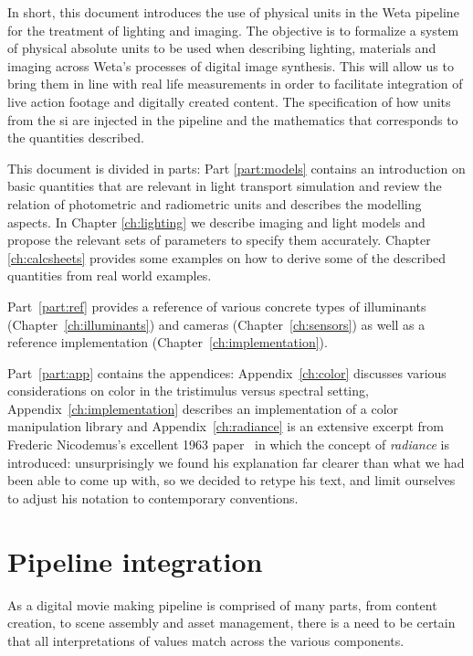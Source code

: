 In short, this document introduces the use of physical units in the
Weta pipeline for the treatment of lighting and imaging.  The
objective is to formalize a system of physical absolute units to be used
when describing lighting, materials and imaging across Weta's
processes of digital image synthesis. This will allow us to bring them in line
with real life measurements in order to facilitate integration of
live action footage and digitally created content. The specification of
how units from the \gls{si} are injected in the pipeline and the
mathematics that corresponds to the quantities described.


This document is divided in parts: Part \ref{part:models}
contains an introduction on basic quantities that are relevant in
light transport simulation and review the relation of photometric and
radiometric units and describes the modelling aspects. In Chapter
\ref{ch:lighting} we describe imaging and light models and propose the
relevant sets of parameters to specify them accurately.  Chapter
\ref{ch:calcsheets} provides some examples on how to derive some of
the described quantities from real world examples.

Part~\ref{part:ref} provides a reference of various concrete types of
illuminants (Chapter~\ref{ch:illuminants}) and cameras (Chapter~\ref{ch:sensors})
as well as a reference implementation (Chapter~\ref{ch:implementation}).

Part~\ref{part:app} contains the appendices: Appendix~\ref{ch:color} discusses
various considerations on color in the tristimulus versus spectral setting,
Appendix~\ref{ch:implementation} describes an implementation of a color manipulation library
and Appendix~\ref{ch:radiance} is an extensive excerpt from Frederic Nicodemus's 
excellent 1963 paper~\cite{nicodemus63} in which the concept of \textsl{radiance}
is introduced: unsurprisingly we found his explanation far clearer than what we 
had been able to come up with, so we decided to retype his text, and limit ourselves
to adjust his notation to contemporary conventions.

\section{Pipeline integration}

As a digital movie making pipeline is comprised of many parts, from content creation, to
scene assembly and asset management, there is a need to
be certain that all interpretations of values match across the various components.

